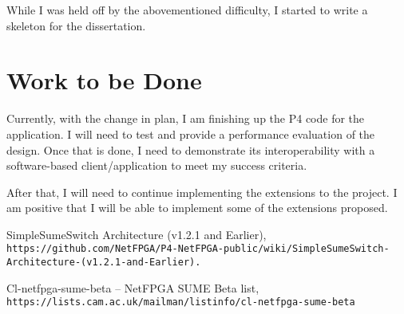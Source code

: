 \documentclass[12pt,a4paper,twoside]{article}
\begin{document}
While I was held off by the abovementioned difficulty, I started to write a skeleton for the dissertation.

\section*{Work to be Done}

Currently, with the change in plan, I am finishing up the P4 code for the application. I will need to test and provide a performance evaluation of the design. Once that is done, I need to demonstrate its interoperability with a software-based client/application to meet my success criteria.

After that, I will need to continue implementing the extensions to the project. I am positive that I will be able to implement some of the extensions proposed.

\begin{thebibliography}{1}
	SimpleSumeSwitch Architecture (v1.2.1 and Earlier), \\\texttt{https://github.com/NetFPGA/P4-NetFPGA-public/wiki/SimpleSumeSwitch-Architecture-(v1.2.1-and-Earlier).}
	
	Cl-netfpga-sume-beta -- NetFPGA SUME Beta list, 
	\\\texttt{https://lists.cam.ac.uk/mailman/listinfo/cl-netfpga-sume-beta}
	
\end{thebibliography}
\end{document}
